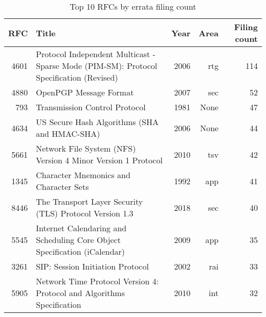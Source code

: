 \begin{table*}
\centering
\footnotesize
\begin{tabular}{rlrrr}
\toprule
\textbf{RFC} & \textbf{Title} & \textbf{Year} & \textbf{Area} & \textbf{Filing count} \\
\midrule
4601 & Protocol Independent Multicast - Sparse Mode (PIM-SM): Protocol Specification (Revised) & 2006 & rtg & 114 \\
4880 & OpenPGP Message Format & 2007 & sec & 52 \\
793 & Transmission Control Protocol & 1981 & None & 47 \\
4634 & US Secure Hash Algorithms (SHA and HMAC-SHA) & 2006 & None & 44 \\
5661 & Network File System (NFS) Version 4 Minor Version 1 Protocol & 2010 & tsv & 42 \\
1345 & Character Mnemonics and Character Sets & 1992 & app & 41 \\
8446 & The Transport Layer Security (TLS) Protocol Version 1.3 & 2018 & sec & 40 \\
5545 & Internet Calendaring and Scheduling Core Object Specification (iCalendar) & 2009 & app & 35 \\
3261 & SIP: Session Initiation Protocol & 2002 & rai & 33 \\
5905 & Network Time Protocol Version 4: Protocol and Algorithms Specification & 2010 & int & 32 \\
\bottomrule
\end{tabular}
\caption{Top 10 RFCs by errata filing count}
\label{tab:top-10-rfcs-by-errata}
\end{table*}

